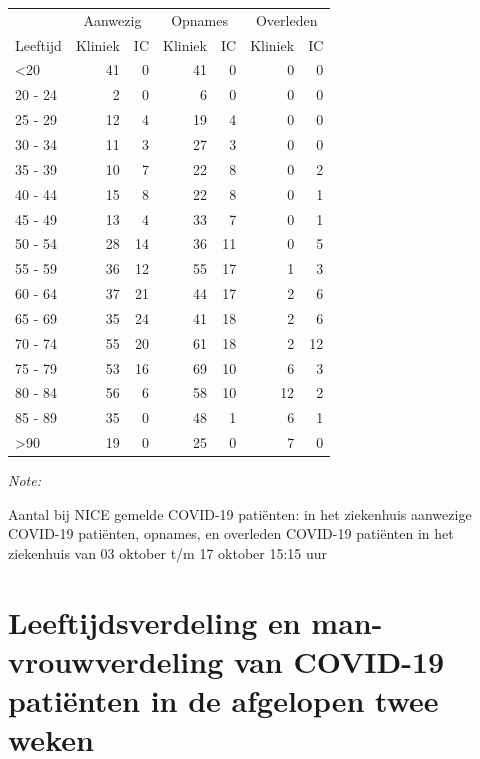 \documentclass[
  english,
  man,floatsintext]{apa6}
\begin{document}
\begin{table}
\centering\begingroup\fontsize{10}{12}\selectfont

\begin{threeparttable}
\begin{tabular}{lrrrrrr}
\toprule
\multicolumn{1}{c}{ } & \multicolumn{2}{c}{Aanwezig} & \multicolumn{2}{c}{Opnames} & \multicolumn{2}{c}{Overleden} \\
\cmidrule(l{3pt}r{3pt}){2-3} \cmidrule(l{3pt}r{3pt}){4-5} \cmidrule(l{3pt}r{3pt}){6-7}
Leeftijd & Kliniek & IC & Kliniek & IC & Kliniek & IC\\
\midrule
<20 & 41 & 0 & 41 & 0 & 0 & 0\\
20 - 24 & 2 & 0 & 6 & 0 & 0 & 0\\
25 - 29 & 12 & 4 & 19 & 4 & 0 & 0\\
30 - 34 & 11 & 3 & 27 & 3 & 0 & 0\\
35 - 39 & 10 & 7 & 22 & 8 & 0 & 2\\
40 - 44 & 15 & 8 & 22 & 8 & 0 & 1\\
45 - 49 & 13 & 4 & 33 & 7 & 0 & 1\\
50 - 54 & 28 & 14 & 36 & 11 & 0 & 5\\
55 - 59 & 36 & 12 & 55 & 17 & 1 & 3\\
60 - 64 & 37 & 21 & 44 & 17 & 2 & 6\\
65 - 69 & 35 & 24 & 41 & 18 & 2 & 6\\
70 - 74 & 55 & 20 & 61 & 18 & 2 & 12\\
75 - 79 & 53 & 16 & 69 & 10 & 6 & 3\\
80 - 84 & 56 & 6 & 58 & 10 & 12 & 2\\
85 - 89 & 35 & 0 & 48 & 1 & 6 & 1\\
>90 & 19 & 0 & 25 & 0 & 7 & 0\\
\bottomrule
\end{tabular}
\begin{tablenotes}
\item \textit{Note: } 
\item Aantal bij NICE gemelde COVID-19 patiënten: in het ziekenhuis aanwezige COVID-19 patiënten, opnames, en overleden COVID-19 patiënten in het ziekenhuis van 03 oktober t/m 17 oktober 15:15 uur
\end{tablenotes}
\end{threeparttable}
\endgroup{}
\end{table}

\newpage

\hypertarget{leeftijdsverdeling-en-man-vrouwverdeling-van-covid-19-patiuxebnten-in-de-afgelopen-twee-weken}{%
\section{Leeftijdsverdeling en man-vrouwverdeling van COVID-19 patiënten in de afgelopen twee weken}\label{leeftijdsverdeling-en-man-vrouwverdeling-van-covid-19-patiuxebnten-in-de-afgelopen-twee-weken}}
\end{document}
